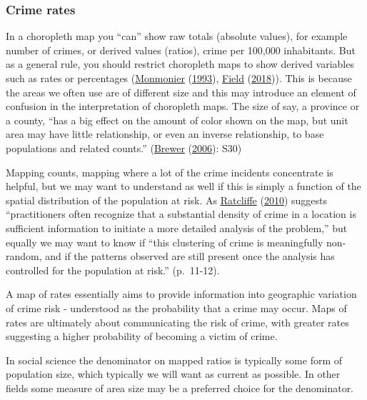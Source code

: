 \documentclass[
  krantz2]{krantz}
\begin{document}
\hypertarget{crime-rates}{%
\subsubsection{Crime rates}\label{crime-rates}}

In a choropleth map you ``can'' show raw totals (absolute values), for example number of crimes, or derived values (ratios), crime per 100,000 inhabitants. But as a general rule, you should restrict choropleth maps to show derived variables such as rates or percentages (\protect\hyperlink{ref-Monmonier_1993}{Monmonier} (\protect\hyperlink{ref-Monmonier_1993}{1993}), \protect\hyperlink{ref-Field_2018}{Field} (\protect\hyperlink{ref-Field_2018}{2018})). This is because the areas we often use are of different size and this may introduce an element of confusion in the interpretation of choropleth maps. The size of say, a province or a county, ``has a big effect on the amount of color shown on the map, but unit area may have little relationship, or even an inverse relationship, to base populations and related counts.'' (\protect\hyperlink{ref-Brewer_2006}{Brewer} (\protect\hyperlink{ref-Brewer_2006}{2006}): S30)

Mapping counts, mapping where a lot of the crime incidents concentrate is helpful, but we may want to understand as well if this is simply a function of the spatial distribution of the population at risk. As \protect\hyperlink{ref-Ratcliffe_2010}{Ratcliffe} (\protect\hyperlink{ref-Ratcliffe_2010}{2010}) suggests ``practitioners often recognize that a substantial density of crime in a location is sufficient information to initiate a more detailed analysis of the problem,'' but equally we may want to know if ``this clustering of crime is meaningfully non-random, and if the patterns observed are still present once the analysis has controlled for the population at risk.'' (p.~11-12).

A map of rates essentially aims to provide information into geographic variation of crime risk - understood as the probability that a crime may occur. Maps of rates are ultimately about communicating the risk of crime, with greater rates suggesting a higher probability of becoming a victim of crime.

In social science the denominator on mapped ratios is typically some form of population size, which typically we will want as current as possible. In other fields some measure of area size may be a preferred choice for the denominator.
\end{document}
